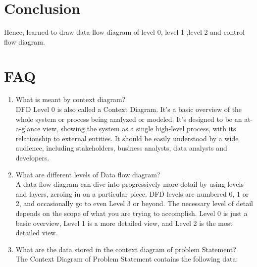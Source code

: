 \documentclass[11pt]{article}
\begin{document}
\section{Conclusion}
Hence, learned to draw data flow diagram of level 0, level 1 ,level 2 and control flow
diagram.

\section{FAQ}

\begin{enumerate}
	\item What is meant by context diagram?\\
	DFD Level 0 is also called a Context Diagram. It's a basic overview of the whole system or process being analyzed or modeled. It's designed to be an at-a-glance view, showing the system as a single high-level process, with its relationship to external entities. It should be easily understood by a wide audience, including stakeholders, business analysts, data analysts and developers. 

	\item What are different levels of Data flow diagram?\\
	
	A data flow diagram can dive into progressively more detail by using levels and layers, zeroing in on a particular piece.  DFD levels are numbered 0, 1 or 2, and occasionally go to even Level 3 or beyond. The necessary level of detail depends on the scope of what you are trying to accomplish. Level 0 is just a basic overview, Level 1 is a more detailed view, and Level 2 is the most detailed view.
	
	\item What are the data stored in the context diagram of problem Statement?\\
	The Context Diagram of Problem Statement contains the following data:

\end{enumerate}
\end{document}
